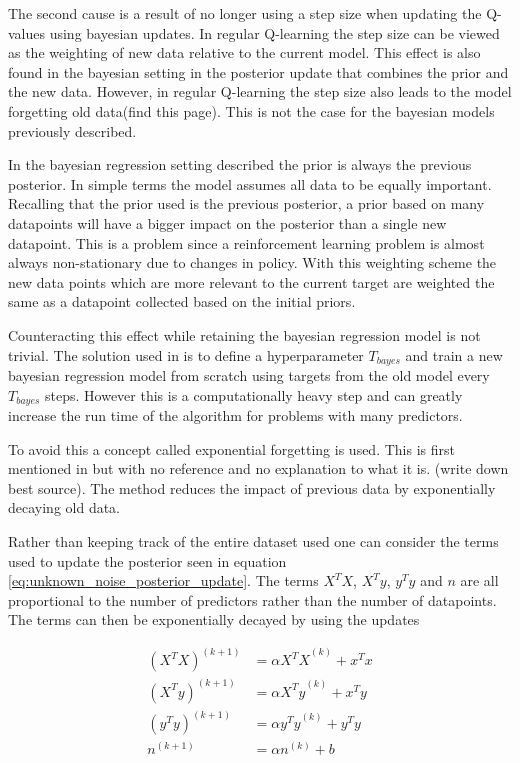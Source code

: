 The second cause is a result of no longer using a step size when updating the Q-values using bayesian updates. In regular Q-learning the step size can be viewed as the weighting of new data relative to the current model. This effect is also found in the bayesian setting in the posterior update that combines the prior and the new data. However, in regular Q-learning the step size also leads to the model forgetting old data(\cite{sutton_barto_2018}\todo find this page). This is not the case for the bayesian models previously described.

In the bayesian regression setting described the prior is always the previous posterior. In simple terms the model assumes all data to be equally important. Recalling that the prior used is the previous posterior, a prior based on many datapoints will have a bigger impact on the posterior than a single new datapoint. This is a problem since a reinforcement learning problem is almost always non-stationary due to changes in policy. With this weighting scheme the new data points which are more relevant to the current target are weighted the same as a datapoint collected based on the initial priors.

Counteracting this effect while retaining the bayesian regression model is not trivial. The solution used in \cite{azziz_2018} is to define a hyperparameter $T_{bayes}$ and train a new bayesian regression model from scratch using targets from the old model every $T_{bayes}$ steps. However this is a computationally heavy step and can greatly increase the run time of the algorithm for problems with many predictors. 

To avoid this a concept called exponential forgetting is used. This is first mentioned in \cite{dearden_1998} but with no reference and no explanation to what it is. (\todo write down best source). The method reduces the impact of previous data by exponentially decaying old data.

Rather than keeping track of the entire dataset used one can consider the terms used to update the posterior seen in equation \ref{eq:unknown_noise_posterior_update}. The terms $X^TX$, $X^Ty$, $y^Ty$ and $n$ are all proportional to the number of predictors rather than the number of datapoints. The terms can then be exponentially decayed by using the updates 

\begin{align}
    (X^TX)^{(k+1)} &= \alpha{X^TX}^{(k)} + x^Tx \\
    (X^Ty)^{(k+1)} &= \alpha{X^Ty}^{(k)} + x^Ty \\
    (y^Ty)^{(k+1)} &= \alpha{y^Ty}^{(k)} + y^Ty \\
    n^{(k+1)} &= \alpha n^{(k)} + b 
\end{align}


